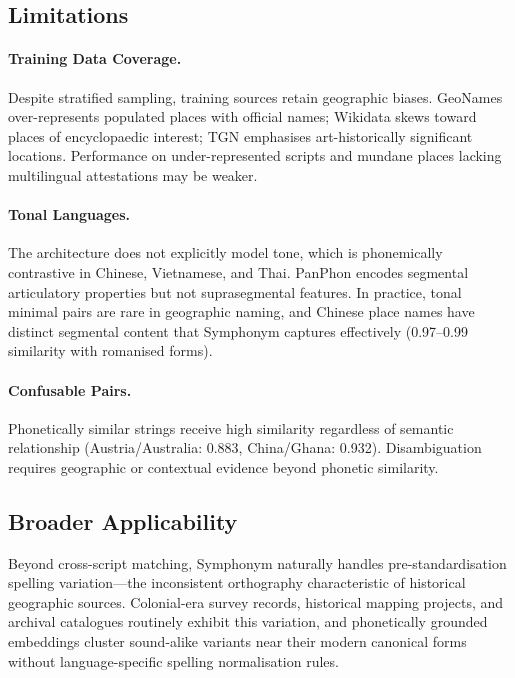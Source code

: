 \documentclass[11pt,a4paper]{article}
\begin{document}
\subsection{Limitations}
\label{subsec:limitations}

\paragraph{Training Data Coverage.} Despite stratified sampling, training sources retain geographic biases. GeoNames over-represents populated places with official names; Wikidata skews toward places of encyclopaedic interest; TGN emphasises art-historically significant locations. Performance on under-represented scripts and mundane places lacking multilingual attestations may be weaker.

\paragraph{Tonal Languages.} The architecture does not explicitly model tone, which is phonemically contrastive in Chinese, Vietnamese, and Thai. PanPhon encodes segmental articulatory properties but not suprasegmental features. In practice, tonal minimal pairs are rare in geographic naming, and Chinese place names have distinct segmental content that Symphonym captures effectively (0.97--0.99 similarity with romanised forms).

\paragraph{Confusable Pairs.} Phonetically similar strings receive high similarity regardless of semantic relationship (Austria/Australia: 0.883, China/Ghana: 0.932). Disambiguation requires geographic or contextual evidence beyond phonetic similarity.

\subsection{Broader Applicability}

Beyond cross-script matching, Symphonym naturally handles pre-standardisation spelling variation---the inconsistent orthography characteristic of historical geographic sources. Colonial-era survey records, historical mapping projects, and archival catalogues routinely exhibit this variation, and phonetically grounded embeddings cluster sound-alike variants near their modern canonical forms without language-specific spelling normalisation rules.
\end{document}
